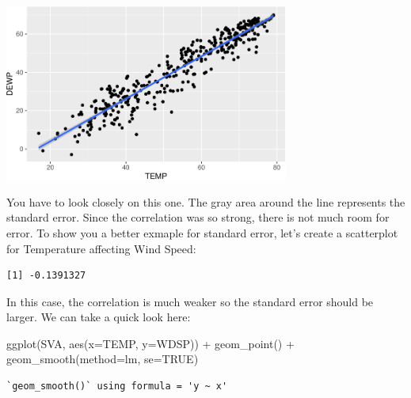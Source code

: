 \documentclass[
  letterpaper,
  DIV=11,
  numbers=noendperiod]{scrreprt}
\newenvironment{Shaded}{\begin{snugshade}}{\end{snugshade}}
\newcommand{\AttributeTok}[1]{\textcolor[rgb]{0.40,0.45,0.13}{#1}}
\newcommand{\ConstantTok}[1]{\textcolor[rgb]{0.56,0.35,0.01}{#1}}
\newcommand{\FunctionTok}[1]{\textcolor[rgb]{0.28,0.35,0.67}{#1}}
\newcommand{\NormalTok}[1]{\textcolor[rgb]{0.00,0.23,0.31}{#1}}
\newcommand{\SpecialCharTok}[1]{\textcolor[rgb]{0.37,0.37,0.37}{#1}}
\newcommand{\StringTok}[1]{\textcolor[rgb]{0.13,0.47,0.30}{#1}}
\begin{document}
\begin{center}
\includegraphics[width=0.7\textwidth,height=\textheight]{Linear_Modeling_and_Regression_files/figure-pdf/unnamed-chunk-13-1.pdf}
\end{center}

You have to look closely on this one. The gray area around the line
represents the standard error. Since the correlation was so strong,
there is not much room for error. To show you a better exmaple for
standard error, let's create a scatterplot for Temperature affecting
Wind Speed:

\begin{Shaded}
\end{Shaded}

\begin{verbatim}
[1] -0.1391327
\end{verbatim}

In this case, the correlation is much weaker so the standard error
should be larger. We can take a quick look here:

\begin{Shaded}
\begin{Highlighting}[]
\FunctionTok{ggplot}\NormalTok{(SVA, }\FunctionTok{aes}\NormalTok{(}\AttributeTok{x=}\NormalTok{TEMP, }\AttributeTok{y=}\NormalTok{WDSP)) }\SpecialCharTok{+}
  \FunctionTok{geom\_point}\NormalTok{() }\SpecialCharTok{+}
  \FunctionTok{geom\_smooth}\NormalTok{(}\AttributeTok{method=}\StringTok{\textquotesingle{}lm\textquotesingle{}}\NormalTok{, }\AttributeTok{se=}\ConstantTok{TRUE}\NormalTok{)}
\end{Highlighting}
\end{Shaded}

\begin{verbatim}
`geom_smooth()` using formula = 'y ~ x'
\end{verbatim}
\end{document}
